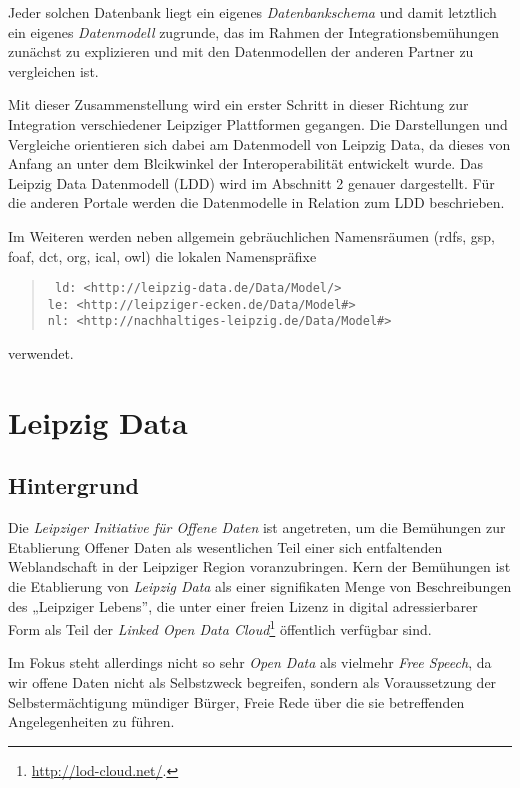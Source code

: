 \documentclass[a4paper,11pt]{article}
\begin{document}
Jeder solchen Datenbank liegt ein eigenes \emph{Datenbankschema} und damit
letztlich ein eigenes \emph{Datenmodell} zugrunde, das im Rahmen der
Integrationsbemühungen zunächst zu explizieren und mit den Datenmodellen der
anderen Partner zu vergleichen ist. 

Mit dieser Zusammenstellung wird ein erster Schritt in dieser Richtung zur
Integration verschiedener Leipziger Plattformen gegangen.  Die Darstellungen
und Vergleiche orientieren sich dabei am Datenmodell von Leipzig Data, da
dieses von Anfang an unter dem Blcikwinkel der Interoperabilität entwickelt
wurde.  Das Leipzig Data Datenmodell (LDD) wird im Abschnitt 2 genauer
dargestellt. Für die anderen Portale werden die Datenmodelle in Relation zum
LDD beschrieben.

Im Weiteren werden neben allgemein gebräuchlichen Namensräumen (rdfs, gsp,
foaf, dct, org, ical, owl) die lokalen Namenspräfixe
\begin{quote}\tt
  ld: <http://leipzig-data.de/Data/Model/> \\ 
  le: <http://leipziger-ecken.de/Data/Model\#> \\ 
  nl: <http://nachhaltiges-leipzig.de/Data/Model\#>
\end{quote}
verwendet.
\newpage

\section{Leipzig Data}

\subsection{Hintergrund}

Die \emph{Leipziger Initiative für Offene Daten} ist angetreten, um die
Bemühungen zur Etablierung Offener Daten als wesentlichen Teil einer sich
entfaltenden Weblandschaft in der Leipziger Region voranzubringen.  Kern der
Bemühungen ist die Etablierung von \emph{Leipzig Data} als einer signifikaten
Menge von Beschreibungen des „Leipziger Lebens”, die unter einer freien Lizenz
in digital adressierbarer Form als Teil der \emph{Linked Open Data
  Cloud}\footnote{\url{http://lod-cloud.net/}.} öffentlich verfügbar sind.

Im Fokus steht allerdings nicht so sehr \emph{Open Data} als vielmehr
\emph{Free Speech}, da wir offene Daten nicht als Selbstzweck begreifen,
sondern als Voraussetzung der Selbstermächtigung mündiger Bürger, Freie Rede
über die sie betreffenden Angelegenheiten zu führen.
\end{document}
